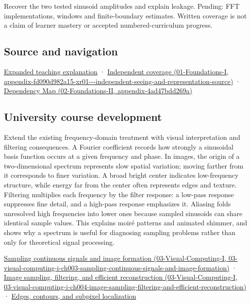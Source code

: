 Recover the two tested sinusoid amplitudes and explain leakage. Pending: FFT implementations, windows and finite-boundary estimates. Written coverage is not a claim of learner mastery or accepted numbered-curriculum progress.

\subsection{Source and navigation}\label{appendix-b60686ba06a1-source-and-navigation}

\href{Continuous\%20Notes/University\%20-\%20Worlds,\%20Images\%20and\%20Inference\%20-\%20Graphics,\%20Vision\%20and\%20Photography\#Fourier\%20coordinates\%20reveal\%20what\%20a\%20filter\%20removes}{Expanded teaching explanation} · \href{../01-Foundations-I/main.pdf\#nameddest=appendix-fd090d982a15-xr01---independent-seeing-and-representation-source}{Independent coverage (01-Foundations-I, appendix-fd090d982a15-xr01-\/-\/-independent-seeing-and-representation-source)} · \href{../02-Foundations-II/main.pdf\#nameddest=appendix-4ad47bdd269a}{Dependency Map (02-Foundations-II, appendix-4ad47bdd269a)}

\subsection{University course development}\label{appendix-b60686ba06a1-university-course-development}

Extend the existing frequency-domain treatment with visual interpretation and filtering consequences. A Fourier coefficient records how strongly a sinusoidal basis function occurs at a given frequency and phase. In images, the origin of a two-dimensional spectrum represents slow spatial variation; moving farther from it corresponds to finer variation. A broad bright center indicates low-frequency structure, while energy far from the center often represents edges and texture. Filtering multiplies each frequency by the filter response: a low-pass response suppresses fine detail, and a high-pass response emphasizes it. Aliasing folds unresolved high frequencies into lower ones because sampled sinusoids can share identical sample values. This explains moiré patterns and animated shimmer, and shows why a spectrum is useful for diagnosing sampling problems rather than only for theoretical signal processing.

\href{../03-Visual-Computing-I/main.pdf\#nameddest=03-visual-computing-i-ch003-sampling-continuous-signals-and-image-formation}{Sampling continuous signals and image formation (03-Visual-Computing-I, 03-visual-computing-i-ch003-sampling-continuous-signals-and-image-formation)} · \href{../03-Visual-Computing-I/main.pdf\#nameddest=03-visual-computing-i-ch004-image-sampling-filtering-and-efficient-reconstruction}{Image sampling, filtering, and efficient reconstruction (03-Visual-Computing-I, 03-visual-computing-i-ch004-image-sampling-filtering-and-efficient-reconstruction)} · \hyperref[04-visual-computing-ii-ch030-edges-contours-and-subpixel-localization]{Edges, contours, and subpixel localization}
